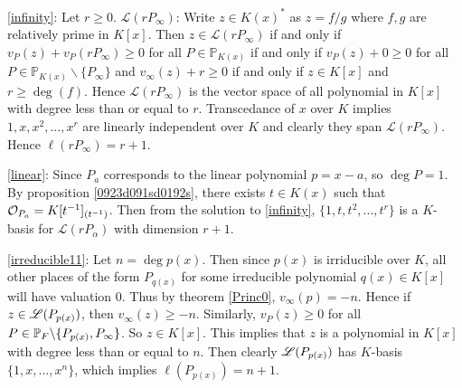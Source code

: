 \begin{solution}
\eqref{infinity}: Let $r \geq 0$. $\mathscr{L}(rP_{\infty})$: Write $z \in K(x)^*$ as $z = f/g$ 
where $f,g$ are relatively prime in $K[x]$. Then $z \in \mathscr{L}(rP_\infty)$ 
if and only if $v_P(z) + v_P(rP_\infty) \geq 0 $ for all 
$P \in \mathbb{P}_{K(x)}$ if and only if $v_P(z) + 0 \geq 0 $ 
for all $P\in \mathbb{P}_{K(x)} \backslash \lbrace P_\infty \rbrace $ 
and $v_\infty(z) + r \geq 0$ if and only if $z \in K[x]$ and 
$r \geq \deg(f)$. Hence $\mathscr{L}(r P_\infty)$ is the vector space 
of all polynomial in $K[x]$ with degree less than or equal to 
$r$. Transcedance of $x$ over $K$ implies $1,x,x^2,...,x^r$ 
are linearly independent over $K$ and clearly they span 
$\mathscr{L}(rP_\infty)$. Hence $\ell(rP_\infty) = r+1$. 

\eqref{linear}: Since $P_a$ corresponds to the linear polynomial
$p = x - a$, so $\deg P = 1$. By proposition \ref{0923d091sd0192s}, there 
exists $t \in K(x)$ such that $\mathcal{O}_{P_a} = K[t^{-1}]_{(t^{-1})}$. Then
from the solution to \eqref{infinity}, $\lbrace 1,t,t^2,...,t^r \rbrace$ is a $K$-basis
for $\mathscr{L}(rP_{\alpha})$ with dimension $r + 1$.

\eqref{irreducible11}: Let $n = \deg p(x)$. Then since 
$p(x)$ is irriducible over $K$, all other places of 
the form $P_{q(x)}$ for some irreducible polynomial $q(x) \in K[x]$
will have valuation $0$. Thus by theorem \ref{Princ0}, $v_\infty(p) = -n$.
Hence if $z \in \mathscr{L}(P_{p(x)})$, then $v_\infty(z) \geq -n$. 
Similarly, $v_P(z) \geq 0$ for all $P \in \mathbb{P}_F \backslash \lbrace P_{p(x)},P_\infty \rbrace$.
So $z \in K[x]$. This implies that $z$ is a polynomial in $K[x]$ with degree 
less than or equal to $n$. Then clearly $\mathscr{L}(P_{p(x)})$ has $K$-basis $\lbrace 1,x,...,x^{n} \rbrace$,
which implies $\ell(P_{p(x)}) = n+1$.

\end{solution}


    
